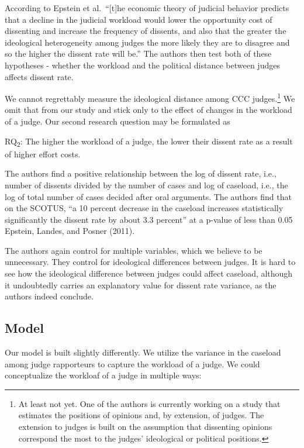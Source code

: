 \documentclass[
  11pt,
]{article}
\begin{document}
According to Epstein et al.~``{[}t{]}he economic theory of judicial
behavior predicts that a decline in the judicial workload would lower
the opportunity cost of dissenting and increase the frequency of
dissents, and also that the greater the ideological heterogeneity among
judges the more likely they are to disagree and so the higher the
dissent rate will be.'' The authors then test both of these hypotheses -
whether the workload and the political distance between judges affects
dissent rate.

We cannot regrettably measure the ideological distance among CCC
judges.\footnote{At least not yet. One of the authors is currently
  working on a study that estimates the positions of opinions and, by
  extension, of judges. The extension to judges is built on the
  assumption that dissenting opinions correspond the most to the judges'
  ideological or political positions.} We omit that from our study and
stick only to the effect of changes in the workload of a judge. Our
second research question may be formulated as

RQ\textsubscript{2}: The higher the workload of a judge, the lower their
dissent rate as a result of higher effort costs.

The authors find a positive relationship between the log of dissent
rate, i.e., number of dissents divided by the number of cases and log of
caseload, i.e., the log of total number of cases decided after oral
arguments. The authors find that on the SCOTUS, ``a 10 percent decrease
in the caseload increases statistically significantly the dissent rate
by about 3.3 percent'' at a p-value of less than 0.05 Epstein, Landes,
and Posner (2011).

The authors again control for multiple variables, which we believe to be
unnecessary. They control for ideological differences between judges. It
is hard to see how the ideological difference between judges could
affect caseload, although it undoubtedly carries an explanatory value
for dissent rate variance, as the authors indeed conclude.

\hypertarget{model}{%
\subsection{Model}\label{model}}

Our model is built slightly differently. We utilize the variance in the
caseload among judge rapporteurs to capture the workload of a judge. We
could conceptualize the workloaf of a judge in multiple ways:
\end{document}

